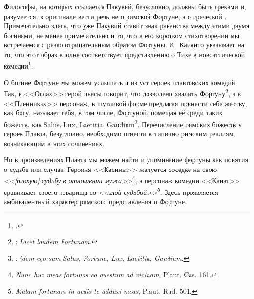 Философы, на которых ссылается Пакувий, безусловно, должны быть греками и, разумеется, в оригинале вести речь не о римской Фортуне, а о греческой . Примечательно здесь, что уже Пакувий ставит знак равенства между этими двумя богинями, не менее примечательно и то, что в его коротком стихотворении мы встречаемся с резко отрицательным образом Фортуны. И.~Кайянто указывает на то, что этот образ вполне соответствует представлению о Тихе в новоаттической комедии\footcite[S. 528--529]{Kajanto1981}.

О богине Фортуне мы можем услышать и из уст героев плавтовских комедий. Так, в <<Ослах>> герой пьесы говорит, что дозволено хвалить Фортуну\footnote{: \textit{Licet laudem Fortunam}.}, а в <<Пленниках>> персонаж, в шутливой форме предлагая принести себе жертву, как богу, называет себя, в том числе, Фортуной, помещая её среди таких божеств, как Salus, Lux, Laetitia, Gaudium\footnote{: \textit{idem ego sum Salus, Fortuna, Lux, Laetitia, Gaudium}.}. Перечисление римских божеств у героев Плавта, безусловно, необходимо отнести к типично римским реалиям, возникающим в этих сочинениях.


Но в произведениях Плавта мы можем найти и упоминание фортуны как понятия о судьбе или случае. Героиня <<Касины>> жалуется соседке на свою \textit{<<[плохую] судьбу в отношении мужа>>}\footnote{\textit{Nunc huc meas fortunas eo questum ad vicinam}, Plaut. Cas. 161.}, а персонаж комедии <<Канат>> сравнивает своего товарища со \textit{<<злой судьбой>>}\footnote{\textit{Malam fortunam in aedis te adduxi meas}, Plaut. Rud. 501.}. Здесь проявляется амбивалентный характер римского представления о Фортуне.


